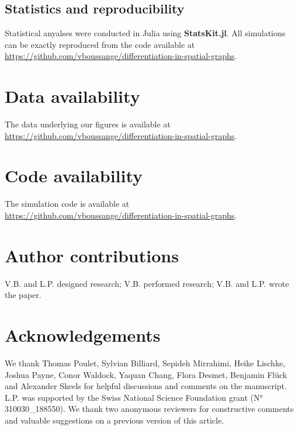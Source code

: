 \subsection{Statistics and reproducibility}
Statistical anyalses were conducted in Julia using \textbf{StatsKit.jl}. 
%
All simulations can be exactly reproduced from the code available at \href{https://github.com/vboussange/differentiation-in-spatial-graphs}{https://github.com/vboussange/differentiation-in-spatial-graphs}.

\section*{Data availability}
The data underlying our figures is available at \href{https://github.com/vboussange/differentiation-in-spatial-graphs}{https://github.com/vboussange/differentiation-in-spatial-graphs}.

\section*{Code availability}

The simulation code is available at \href{https://github.com/vboussange/differentiation-in-spatial-graphs}{https://github.com/vboussange/differentiation-in-spatial-graphs}.

\section*{Author contributions}
V.B. and L.P. designed research; V.B. performed research; V.B. and L.P. wrote the paper.

\section*{Acknowledgements}
We thank Thomas Poulet, Sylvian Billiard, Sepideh Mirrahimi, Heike Lischke, Joshua Payne, Conor Waldock, Yaquan Chang, Flora Desmet, Benjamin Flück and Alexander Skeels for helpful discussions and comments on the manuscript. L.P. was supported by the Swiss National Science Foundation grant (N° 310030\_188550).
We thank two anonymous reviewers for constructive comments and valuable suggestions on a previous version of this article.
  
  
\printbibliography[heading=subbibliography]
